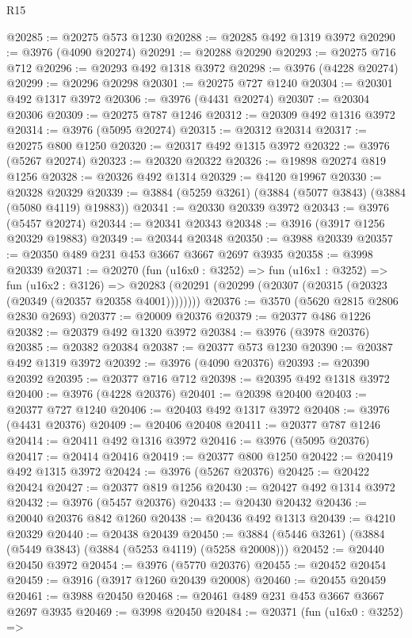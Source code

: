 \begin{lexlean}{R15}
\begin{coremodule}
@20285 := @20275 @573 @1230
@20288 := @20285 @492 @1319 @3972
@20290 := @3976 (@4090 @20274)
@20291 := @20288 @20290
@20293 := @20275 @716 @712
@20296 := @20293 @492 @1318 @3972
@20298 := @3976 (@4228 @20274)
@20299 := @20296 @20298
@20301 := @20275 @727 @1240
@20304 := @20301 @492 @1317 @3972
@20306 := @3976 (@4431 @20274)
@20307 := @20304 @20306
@20309 := @20275 @787 @1246
@20312 := @20309 @492 @1316 @3972
@20314 := @3976 (@5095 @20274)
@20315 := @20312 @20314
@20317 := @20275 @800 @1250
@20320 := @20317 @492 @1315 @3972
@20322 := @3976 (@5267 @20274)
@20323 := @20320 @20322
@20326 := @19898 @20274 @819 @1256
@20328 := @20326 @492 @1314
@20329 := @4120 @19967
@20330 := @20328 @20329
@20339 := @3884 (@5259 @3261) (@3884 (@5077 @3843) (@3884 (@5080 @4119) @19883))
@20341 := @20330 @20339 @3972
@20343 := @3976 (@5457 @20274)
@20344 := @20341 @20343
@20348 := @3916 (@3917 @1256 @20329 @19883)
@20349 := @20344 @20348
@20350 := @3988 @20339
@20357 := @20350 @489 @231 @453 @3667 @3667 @2697 @3935
@20358 := @3998 @20339
@20371 := @20270
    (fun (u16x0 : @3252) =>
    fun (u16x1 : @3252) =>
    fun (u16x2 : @3126) =>
    @20283 (@20291 (@20299 (@20307 (@20315 (@20323 (@20349 (@20357 @20358 @4001))))))))
@20376 := @3570 (@5620 @2815 @2806 @2830 @2693)
@20377 := @20009 @20376
@20379 := @20377 @486 @1226
@20382 := @20379 @492 @1320 @3972
@20384 := @3976 (@3978 @20376)
@20385 := @20382 @20384
@20387 := @20377 @573 @1230
@20390 := @20387 @492 @1319 @3972
@20392 := @3976 (@4090 @20376)
@20393 := @20390 @20392
@20395 := @20377 @716 @712
@20398 := @20395 @492 @1318 @3972
@20400 := @3976 (@4228 @20376)
@20401 := @20398 @20400
@20403 := @20377 @727 @1240
@20406 := @20403 @492 @1317 @3972
@20408 := @3976 (@4431 @20376)
@20409 := @20406 @20408
@20411 := @20377 @787 @1246
@20414 := @20411 @492 @1316 @3972
@20416 := @3976 (@5095 @20376)
@20417 := @20414 @20416
@20419 := @20377 @800 @1250
@20422 := @20419 @492 @1315 @3972
@20424 := @3976 (@5267 @20376)
@20425 := @20422 @20424
@20427 := @20377 @819 @1256
@20430 := @20427 @492 @1314 @3972
@20432 := @3976 (@5457 @20376)
@20433 := @20430 @20432
@20436 := @20040 @20376 @842 @1260
@20438 := @20436 @492 @1313
@20439 := @4210 @20329
@20440 := @20438 @20439
@20450 := @3884 (@5446 @3261) (@3884 (@5449 @3843) (@3884 (@5253 @4119) (@5258 @20008)))
@20452 := @20440 @20450 @3972
@20454 := @3976 (@5770 @20376)
@20455 := @20452 @20454
@20459 := @3916 (@3917 @1260 @20439 @20008)
@20460 := @20455 @20459
@20461 := @3988 @20450
@20468 := @20461 @489 @231 @453 @3667 @3667 @2697 @3935
@20469 := @3998 @20450
@20484 := @20371
    (fun (u16x0 : @3252) =>

\end{coremodule}
\end{lexlean}
